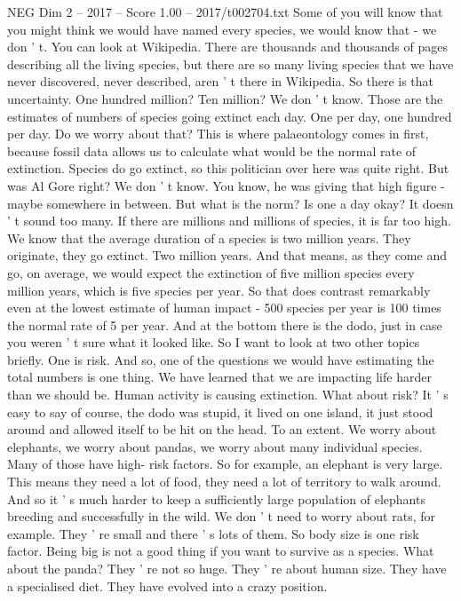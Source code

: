 \begin{textsample}{NEG Dim 2 – 2017 – Score 1.00 – 2017/t002704.txt}
Some of you will know that you might think we would have named every species, we would know that - we don ' t.
You can look at Wikipedia.
There are thousands and thousands of pages describing all the living species, but there are so many living species that we have never discovered, never described, aren ' t there in Wikipedia.
So there is that uncertainty.
One hundred million?
Ten million?
We don ' t know.
Those are the estimates of numbers of species going extinct each day.
One per day, one hundred per day.
Do we worry about that?
This is where palaeontology comes in first, because fossil data allows us to calculate what would be the normal rate of extinction.
Species do go extinct, so this politician over here was quite right.
But was Al Gore right?
We don ' t know.
You know, he was giving that high figure - maybe somewhere in between.
But what is the norm?
Is one a day okay?
It doesn ' t sound too many.
If there are millions and millions of species, it is far too high.
We know that the average duration of a species is two million years.
They originate, they go extinct.
Two million years.
And that means, as they come and go, on average, we would expect the extinction of five million species every million years, which is five species per year.
So that does contrast remarkably even at the lowest estimate of human impact - 500 species per year is 100 times the normal rate of 5 per year.
And at the bottom there is the dodo, just in case you weren ' t sure what it looked like.
So I want to look at two other topics briefly.
One is risk.
And so, one of the questions we would have estimating the total numbers is one thing.
We have learned that we are impacting life harder than we should be.
Human activity is causing extinction.
What about risk?
It ' s easy to say of course, the dodo was stupid, it lived on one island, it just stood around and allowed itself to be hit on the head.
To an extent.
We worry about elephants, we worry about pandas, we worry about many individual species.
Many of those have high- risk factors.
So for example, an elephant is very large.
This means they need a lot of food, they need a lot of territory to walk around.
And so it ' s much harder to keep a sufficiently large population of elephants breeding and successfully in the wild.
We don ' t need to worry about rats, for example.
They ' re small and there ' s lots of them.
So body size is one risk factor.
Being big is not a good thing if you want to survive as a species.
What about the panda?
They ' re not so huge.
They ' re about human size.
They have a specialised diet.
They have evolved into a crazy position.

\end{textsample}
